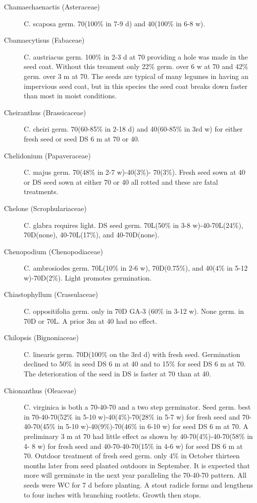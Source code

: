 \begin{description}
\item [Chamaechaenactis (Asteraceae)] C. scaposa germ. 70(100\% in 7-9 d)
and 40(100\% in 6-8 w).
\item [Cbamaecytisus (Fabaceae)] C. austriacus germ. 100\% in 2-3 d at 70
providing a hole was made in the seed coat. Without this treament only 22\% germ.
over 6 w at 70 and 42\% germ. over 3 m at 70. The seeds are typical of many legumes
in having an impervious seed coat, but in this species the seed coat breaks down
faster than most in moist conditions.
\item [Cheiranthus (Brassicaceae)] C. cheiri germ. 70(60-85\% in 2-18 d) and
40(60-85\% in 3rd w) for either fresh seed or seed DS 6 m at 70 or 40.
\item [Chelidonium (Papaveraceae)] C. majus germ. 70(48\% in 2-7 w)-40(3\%)-
70(3\%). Fresh seed sown at 40 or DS seed sown at either 70 or 40 all rotted and
these are fatal treatments.
\item [Chelone (Scrophulariaceae)] C. glabra requires light. DS seed germ.
70L(50\% in 3-8 w)-40-70L(24\%), 70D(none), 40-70L(17\%), and 40-70D(none).
\item [Chenopodium (Chenopodiaceae)] C. ambrosiodes germ. 70L(10\% in 2-6
w), 70D(0.75\%), and 40(4\% in 5-12 w)-70D(2\%). Light promotes germination.
\item [Chiastophyllum (Crassulaceae)] C. oppositifolia germ. only in 70D GA-3
(60\% in 3-12 w). None germ. in 70D or 70L. A prior 3m at 40 had no effect.

\item [Chilopsis (Bignoniaceae)] C. linearis germ. 70D(100\% on the 3rd d) with
fresh seed. Germination declined to 50\% in seed DS 6 m at 40 and to 15\% for seed
DS 6 m at 70. The deterioration of the seed in DS is faster at 70 than at 40.
\item [Chionanthus (Oleaceae)] C. virginica is both a 70-40-70 and a two step
germinator. Seed germ. best in 70-40-70(52\% in 5-10 w)-40(4\%)-70(28\% in 5-7 w) for
fresh seed and 70-40-70(45\% in 5-10 w)-40(9\%)-70(46\% in 6-10 w) for seed DS 6 m
at 70. A preliminary 3 m at 70 had little effect as shown by 40-70(4\%)-40-70(58\% in 4-
8 w) for fresh seed and 40-70-40-70(15\% in 4-6 w) for seed DS 6 m at 70. Outdoor
treatment of fresh seed germ. only 4\% in October thirteen months later from seed
planted outdoors in September. It is expected that more will germinate in the next year
paralleling the 70-40-70 pattern. All seeds were WC for 7 d before planting. A stout
radicle forms and lengthens to four inches with branching rootlets. Growth then stops.


\end{description}
